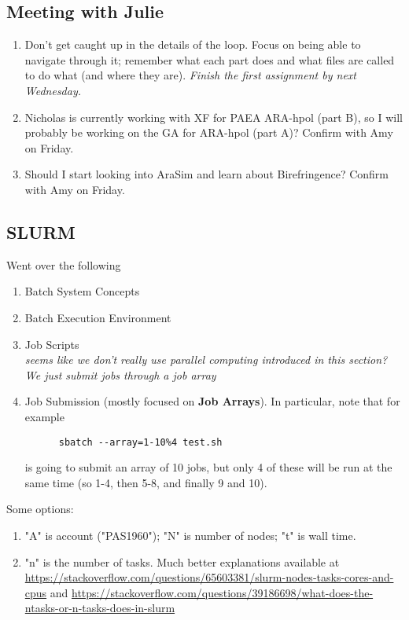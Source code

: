 \documentclass[12pt,letterpaper]{article}
\begin{document}
\subsection{Meeting with Julie}
\begin{enumerate}
  \item Don't get caught up in the details of the loop.
    Focus on being able to navigate through it; remember what each part does
    and what files are called to do what (and where they are). 
    \textit{Finish the first assignment by next Wednesday.}
  \item Nicholas is currently working with XF for PAEA ARA-hpol (part B), 
    so I will probably be working on the GA for ARA-hpol (part A)? 
    Confirm with Amy on Friday.
  \item Should I start looking into AraSim and learn about Birefringence? 
    Confirm with Amy on Friday.
\end{enumerate}

\subsection{SLURM}
Went over the following
\begin{enumerate}
  \item Batch System Concepts
  \item Batch Execution Environment
  \item Job Scripts\\
    \textit{seems like we don't really use parallel computing introduced in
    this section? We just submit jobs through a job array}
  \item Job Submission (mostly focused on \textbf{Job Arrays}). 
    In particular, note that for example 
    \begin{verbatim}
      sbatch --array=1-10%4 test.sh
    \end{verbatim}
    is going to submit an array of 10 jobs, but only 4 of these will be run at
    the same time (so 1-4, then 5-8, and finally 9 and 10).
\end{enumerate}
Some options:
\begin{enumerate}
  \item "A" is account ("PAS1960"); "N" is number of nodes; "t" is wall time.
  \item "n" is the number of tasks. Much better explanations available at
    \url{https://stackoverflow.com/questions/65603381/slurm-nodes-tasks-cores-and-cpus}
    and 
    \url{https://stackoverflow.com/questions/39186698/what-does-the-ntasks-or-n-tasks-does-in-slurm}
\end{enumerate}
\end{document}
